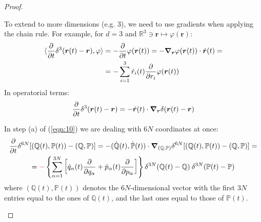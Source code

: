 \documentclass[../../main.tex]{subfiles}
\begin{document}
\begin{proof}
\begin{expl}
    To extend to more dimensions (e.g. $3$), we need to use gradients when applying the chain rule. For example, for $d=3$ and $\mathbb{R}^3 \ni \bm{r} \mapsto \varphi(\bm{r})$:
    \begin{align*}
        \langle \pdv{t} \delta^3(\bm{r}(t) - \bm{r}), \varphi\rangle &= -\pdv{t} \varphi(\bm{r}(t)) = -\grad_{\bm{r}} \varphi(\bm{r}(t)) \cdot \dot{\bm{r}}(t) =\\
        &= - \sum_{i=1}^3 \dot{r}_i(t) \pdv{r_i} \varphi(\bm{r}(t))
    \end{align*}
    In operatorial terms:
    \begin{align*}
        \pdv{t}\delta^3(\bm{r}(t)-\bm{r}) = -\dot{\bm{r}}(t) \cdot \grad_{\bm{r}} \delta(\bm{r}(t) - \bm{r})
    \end{align*}

    In step (a) of (\ref{eqn:10}) we are dealing with $6N$ coordinates at once:
    \begin{align*}
        \pdv{t} \delta^{6N}[(\mathbb{Q}(t), \mathbb{P}(t)) - (\mathbb{Q},\mathbb{P})] &= -(\dot{\mathbb{Q}}(t), \dot{\mathbb{P}}(t)) \cdot \grad_{(\bm{\mathbb{Q}}, \bm{\mathbb{P}})} \delta^{6N}[(\mathbb{Q}(t), \mathbb{P}(t)) - (\mathbb{Q},\mathbb{P})] =\\
        =\textcolor{Red}{-} \left\{\sum_{\alpha=1}^{3N} \left[\dot{q}_\alpha(t) \pdv{q_\alpha} + \dot{p}_\alpha(t) \pdv{p_\alpha}\right] \right\} \delta^{3N}(\mathbb{Q}(t) - \mathbb{Q}) \>  \delta^{3N}(\mathbb{P}(t) - \mathbb{P}) \span
    \end{align*}
    where $(\mathbb{Q}(t), \mathbb{P}(t))$ denotes the $6N$-dimensional vector with the first $3N$ entries equal to the ones of $\mathbb{Q}(t)$, and the last ones equal to those of $\mathbb{P}(t)$.
        
    \end{expl}


\end{proof}
\end{document}
